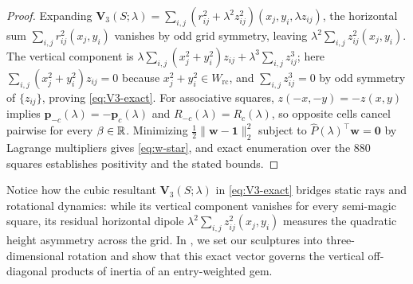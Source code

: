 \begin{proof}
Expanding $\mathbf V_3(S;\lambda)=\sum_{i,j}(r_{ij}^2+\lambda^2z_{ij}^2)(x_j,y_i,\lambda z_{ij})$, the horizontal sum $\sum_{i,j}r_{ij}^2(x_j,y_i)$ vanishes by odd grid symmetry, leaving $\lambda^2\sum_{i,j}z_{ij}^2(x_j,y_i)$. The vertical component is $\lambda\sum_{i,j}(x_j^2+y_i^2)z_{ij}+\lambda^3\sum_{i,j}z_{ij}^3$; here $\sum_{i,j}(x_j^2+y_i^2)z_{ij}=0$ because $x_j^2+y_i^2\in W_{\mathrm{rc}}$, and $\sum_{i,j}z_{ij}^3=0$ by odd symmetry of $\{z_{ij}\}$, proving \eqref{eq:V3-exact}. For associative squares, $z(-x,-y)=-z(x,y)$ implies $\mathbf p_{-c}(\lambda)=-\mathbf p_c(\lambda)$ and $R_{-c}(\lambda)=R_c(\lambda)$, so opposite cells cancel pairwise for every $\beta\in\mathbb{R}$. Minimizing $\frac12\|\mathbf w-\mathbf 1\|_2^2$ subject to $\hat P(\lambda)^{\top}\mathbf w=\mathbf 0$ by Lagrange multipliers gives \eqref{eq:w-star}, and exact enumeration over the $880$ squares establishes positivity and the stated bounds.
\end{proof}

Notice how the cubic resultant $\mathbf V_3(S;\lambda)$ in \eqref{eq:V3-exact} bridges static rays and rotational dynamics: while its vertical component vanishes for every semi-magic square, its residual horizontal dipole $\lambda^2\sum_{i,j}z_{ij}^2(x_j,y_i)$ measures the quadratic height asymmetry across the grid. In , we set our sculptures into three-dimensional rotation and show that this exact vector governs the vertical off-diagonal products of inertia of an entry-weighted gem.

